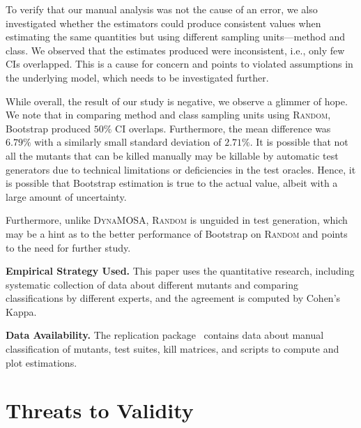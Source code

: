 \documentclass[sigconf]{acmart}
\newcommand{\Bootstrap}{Bootstrap\xspace}
\newcommand{\EvosuiteRandom}{\textsc{Random}\xspace}
\newcommand{\EvosuiteDynamosa}{\textsc{DynaMOSA}\xspace}
\newcommand{\todo}[1]{}
\begin{document}
To verify that our manual analysis was not the cause of an error, we also
investigated whether the estimators could produce consistent values when
estimating the same quantities but using different sampling units---method and class.
We observed that the estimates produced were inconsistent, i.e., only few CIs overlapped.
This is a cause for concern and points to violated assumptions in the
underlying model, which needs to be investigated further.

While overall, the result of our study is negative, we observe a glimmer of hope.
We note that in  comparing method and class sampling
units using \EvosuiteRandom, \Bootstrap produced $50\%$ CI overlaps. Furthermore,
the mean difference was $6.79\%$ with a similarly small standard deviation
of $2.71\%$. It is possible that not all the mutants that can be killed manually
may be killable by automatic test generators due to technical limitations or
deficiencies in the test oracles. Hence, it is possible that \Bootstrap estimation is true to the
actual value, albeit with a large amount of uncertainty.

Furthermore, unlike \EvosuiteDynamosa, \EvosuiteRandom is unguided in
test generation, which may be a hint as to the better performance of \Bootstrap
on \EvosuiteRandom and points to the need for further study.


\noindent\textbf{Empirical Strategy Used.}
This paper uses the quantitative research, including systematic
collection of data about different mutants and comparing classifications by
different experts, and the agreement is computed by Cohen's Kappa.%

\noindent\textbf{Data Availability.}
The replication package~\cite{replication-package} contains data about manual
classification of mutants, test suites, kill matrices, and scripts
to compute and plot estimations.

\section{Threats to Validity}
\label{sec:threats}
\end{document}
